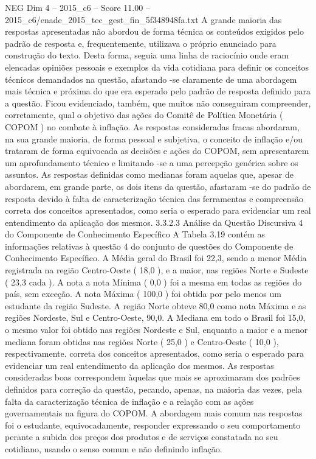 \begin{textsample}{NEG Dim 4 – 2015\_c6 – Score 11.00 – 2015\_c6/enade\_2015\_tec\_gest\_fin\_5f348948fa.txt}
A grande maioria das respostas apresentadas não abordou de forma técnica os conteúdos exigidos pelo padrão de resposta e, frequentemente, utilizava o próprio enunciado para construção do texto.
Desta forma, seguia uma linha de raciocínio onde eram elencadas opiniões pessoais e exemplos da vida cotidiana para definir os conceitos técnicos demandados na questão, afastando -se claramente de uma abordagem mais técnica e próxima do que era esperado pelo padrão de resposta definido para a questão.
Ficou evidenciado, também, que muitos não conseguiram compreender, corretamente, qual o objetivo das ações do Comitê de Política Monetária ( COPOM ) no combate à inflação.
As respostas consideradas fracas abordaram, na sua grande maioria, de forma pessoal e subjetiva, o conceito de inflação e/ou trataram de forma equivocada as decisões e ações do COPOM, sem apresentarem um aprofundamento técnico e limitando -se a uma percepção genérica sobre os assuntos.
As respostas definidas como medianas foram aquelas que, apesar de abordarem, em grande parte, os dois itens da questão, afastaram -se do padrão de resposta devido à falta de caracterização técnica das ferramentas e compreensão correta dos conceitos apresentados, como seria o esperado para evidenciar um real entendimento da aplicação dos mesmos. 3.3.2.3 Análise da Questão Discursiva 4 do Componente de Conhecimento Específico A Tabela 3.19 contém as informações relativas à questão 4 do conjunto de questões do Componente de Conhecimento Específico.
A Média geral do Brasil foi 22,3, sendo a menor Média registrada na região Centro-Oeste ( 18,0 ), e a maior, nas regiões Norte e Sudeste ( 23,3 cada ).
A nota a nota Mínima ( 0,0 ) foi a mesma em todas as regiões do país, sem exceção.
A nota Máxima ( 100,0 ) foi obtida por pelo menos um estudante da região Sudeste.
A região Norte obteve 80,0 como nota Máxima e as regiões Nordeste, Sul e Centro-Oeste, 90,0.
A Mediana em todo o Brasil foi 15,0, o mesmo valor foi obtido nas regiões Nordeste e Sul, enquanto a maior e a menor mediana foram obtidas nas regiões Norte ( 25,0 ) e Centro-Oeste ( 10,0 ), respectivamente. correta dos conceitos apresentados, como seria o esperado para evidenciar um real entendimento da aplicação dos mesmos.
As respostas consideradas boas correspondem àquelas que mais se aproximaram dos padrões definidos para correção da questão, pecando, apenas, na maioria das vezes, pela falta da caracterização técnica de inflação e a relação com as ações governamentais na figura do COPOM.
A abordagem mais comum nas respostas foi o estudante, equivocadamente, responder expressando o seu comportamento perante a subida dos preços dos produtos e de serviços constatada no seu cotidiano, usando o senso comum e não definindo inflação.

\end{textsample}
